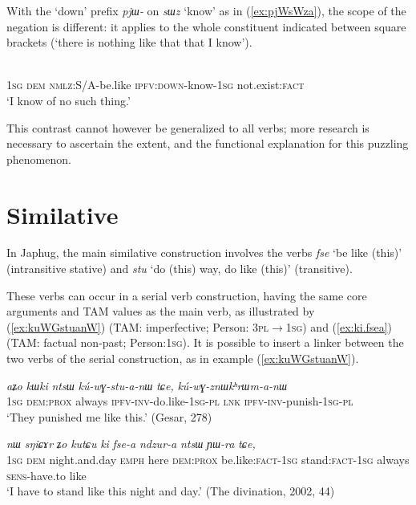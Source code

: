 \documentclass[oneside,a4paper,11pt]{article}
\newcommand{\ipa}[1]{{\phon\textit{#1}}}
\newcommand{\forme}[2]{\ipa{#1} `#2'}
\begin{document}
With the `down' prefix \ipa{pjɯ-} on \forme{sɯz}{know} as in (\ref{ex:pjWsWza}), the scope of the negation is different: it applies to the whole constituent indicated between square brackets (`there is nothing like that that I know').

\begin{exe}
\ex \label{ex:pjWsWza}
\gll [\ipa{aʑo} 	\ipa{nɯ} 	\ipa{kɯ-fse} 	\ipa{pjɯ-sɯz-a}]	\ipa{me} \\
\textsc{1sg} \textsc{dem} \textsc{nmlz}:S/A-be.like \textsc{ipfv:down}-know-\textsc{1sg} not.exist:\textsc{fact} \\
\glt `I know of no such thing.'
\end{exe}

This contrast cannot however be generalized to all verbs; more research is necessary to ascertain the extent, and the functional explanation for this puzzling phenomenon.

\section{Similative} \label{sec:similative}
In Japhug, the main similative construction involves the verbs \forme{fse}{be like (this)} (intransitive stative) and \forme{stu}{do (this) way, do like (this)} (transitive).

These verbs can occur in a serial verb construction, having the same core arguments and TAM values as the main verb, as illustrated by  (\ref{ex:kuWGstuanW}) (TAM: imperfective; Person: \textsc{3pl$\rightarrow$1sg}) and (\ref{ex:ki.fsea}) (TAM: factual non-past; Person:\textsc{1sg}).  It is possible to insert a linker between the two verbs of the serial construction, as in example (\ref{ex:kuWGstuanW}). 

\begin{exe}
\ex \label{ex:kuWGstuanW}
\gll 	
 \ipa{aʑo} 	\ipa{kɯki} 	\ipa{ntsɯ} 	\ipa{kú-wɣ-stu-a-nɯ} 	\ipa{tɕe,} 	\ipa{kú-wɣ-znɯkʰrɯm-a-nɯ} \\
 \textsc{1sg} \textsc{dem:prox} always \textsc{ipfv-inv}-do.like-\textsc{1sg-pl} \textsc{lnk} \textsc{ipfv-inv}-punish-\textsc{1sg-pl} \\
 \glt `They punished me like this.' (Gesar, 278)
\end{exe}	


\begin{exe}
\ex \label{ex:ki.fsea}
\gll \ipa{aʑo} 	\ipa{nɯ} 	\ipa{sŋiɕɤr} 	\ipa{ʑo} 	\ipa{kutɕu} 	\ipa{ki} 	\ipa{fse-a} 	\ipa{ndzur-a} 	\ipa{ntsɯ} 	\ipa{ɲɯ-ra} 	\ipa{tɕe,} \\
\textsc{1sg} \textsc{dem} night.and.day \textsc{emph} here \textsc{dem:prox} be.like:\textsc{fact-1sg} stand:\textsc{fact-1sg} always \textsc{sens}-have.to like \\
\glt `I have to stand like this night and day.' (The divination, 2002, 44)
\end{exe}
\end{document}
